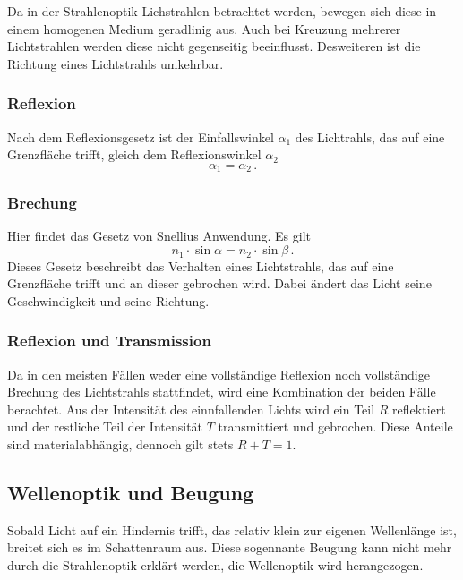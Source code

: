     \noindent
    Da in der Strahlenoptik Lichstrahlen betrachtet werden, bewegen sich diese in einem homogenen Medium geradlinig aus.
    Auch bei Kreuzung mehrerer Lichtstrahlen werden diese nicht gegenseitig beeinflusst.
    Desweiteren ist die Richtung eines Lichtstrahls umkehrbar.

    \subsubsection*{Reflexion}
        Nach dem Reflexionsgesetz ist der Einfallswinkel $\alpha_1$ des Lichtrahls, das auf eine Grenzfläche trifft, gleich dem Reflexionswinkel $\alpha_2$
        \begin{equation*}
            \alpha_1 = \alpha_2 \, .
        \end{equation*}

    \subsubsection*{Brechung}
        Hier findet das Gesetz von Snellius Anwendung.
        Es gilt
        \begin{equation*}
            n_1 \cdot \sin \alpha = n_2 \cdot \sin \beta \, .
        \end{equation*}
        Dieses Gesetz beschreibt das Verhalten eines Lichtstrahls, das auf eine Grenzfläche trifft und an dieser gebrochen wird.
        Dabei ändert das Licht seine Geschwindigkeit und seine Richtung.

    \subsubsection*{Reflexion und Transmission}
        Da in den meisten Fällen weder eine vollständige Reflexion noch vollständige Brechung des Lichtstrahls stattfindet, wird eine Kombination der beiden Fälle berachtet.
        Aus der Intensität des einnfallenden Lichts wird ein Teil $R$ reflektiert und der restliche Teil der Intensität $T$ transmittiert und gebrochen.
        Diese Anteile sind materialabhängig, dennoch gilt stets $R + T = 1$.

\subsection{Wellenoptik und Beugung}
\label{Beugung}
    Sobald Licht auf ein Hindernis trifft, das relativ klein zur eigenen Wellenlänge ist, breitet sich es im Schattenraum aus.
    Diese sogennante Beugung kann nicht mehr durch die Strahlenoptik erklärt werden, die Wellenoptik wird herangezogen.
    
